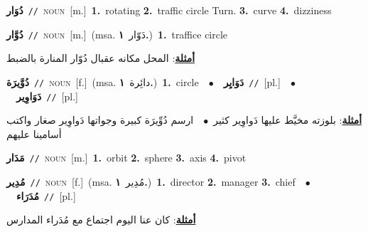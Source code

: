 \documentclass[10pt,a4paper,twoside]{article} %
\begin{document}
\begin{multicols}{2}
{\setlength\topsep{0pt}\textbf{\foreignlanguage{arabic}{دُوَار}}\ {\color{gray}\texttt{//}\color{black}}\ \textsc{noun}\ [m.]\ \textbf{1.}~rotating  \textbf{2.}~traffic circle Turn.  \textbf{3.}~curve  \textbf{4.}~dizziness\ } \vspace{2mm}

{\setlength\topsep{0pt}\textbf{\foreignlanguage{arabic}{دُوَّار}}\ {\color{gray}\texttt{//}\color{black}}\ \textsc{noun}\ [m.]\ \color{gray}(msa. \foreignlanguage{arabic}{دَوّار}~\foreignlanguage{arabic}{\textbf{١.}})\color{black}\ \textbf{1.}~traffice circle\  \begin{flushright}\color{gray}\foreignlanguage{arabic}{\textbf{\underline{\foreignlanguage{arabic}{أمثلة}}}: المحل مكانه عقبال دُوّار المنارة بالضبط}\end{flushright}\color{black}} \vspace{2mm}

{\setlength\topsep{0pt}\textbf{\foreignlanguage{arabic}{دُوَّيرَة}}\ {\color{gray}\texttt{//}\color{black}}\ \textsc{noun}\ [f.]\ \color{gray}(msa. \foreignlanguage{arabic}{دائِرة}~\foreignlanguage{arabic}{\textbf{١.}})\color{black}\ \textbf{1.}~circle\ \ $\bullet$\ \ \setlength\topsep{0pt}\textbf{\foreignlanguage{arabic}{دَوَايِر}}\ {\color{gray}\texttt{//}\color{black}}\ [pl.]\ \ $\bullet$\ \ \setlength\topsep{0pt}\textbf{\foreignlanguage{arabic}{دَوَاوِير}}\ {\color{gray}\texttt{//}\color{black}}\ [pl.]\  \begin{flushright}\color{gray}\foreignlanguage{arabic}{\textbf{\underline{\foreignlanguage{arabic}{أمثلة}}}: بلوزته مخيَّط عليها دَواوِير كثير\ $\bullet$\ \  ارسم دُوِّيرَة كبيرة وجواتها دَواوِير صغار واكتب أسامينا عليهم}\end{flushright}\color{black}} \vspace{2mm}

{\setlength\topsep{0pt}\textbf{\foreignlanguage{arabic}{مَدَار}}\ {\color{gray}\texttt{//}\color{black}}\ \textsc{noun}\ [m.]\ \textbf{1.}~orbit  \textbf{2.}~sphere  \textbf{3.}~axis  \textbf{4.}~pivot\ } \vspace{2mm}

{\setlength\topsep{0pt}\textbf{\foreignlanguage{arabic}{مُدِير}}\ {\color{gray}\texttt{//}\color{black}}\ \textsc{noun}\ [f.]\ \color{gray}(msa. \foreignlanguage{arabic}{مُدِير}~\foreignlanguage{arabic}{\textbf{١.}})\color{black}\ \textbf{1.}~director  \textbf{2.}~manager  \textbf{3.}~chief\ \ $\bullet$\ \ \setlength\topsep{0pt}\textbf{\foreignlanguage{arabic}{مُدَرَاء}}\ {\color{gray}\texttt{//}\color{black}}\ [pl.]\  \begin{flushright}\color{gray}\foreignlanguage{arabic}{\textbf{\underline{\foreignlanguage{arabic}{أمثلة}}}: كان عنا اليوم اجتماع مع مُدَراء المدارس}\end{flushright}\color{black}} \vspace{2mm}


\end{multicols}
\end{document}
